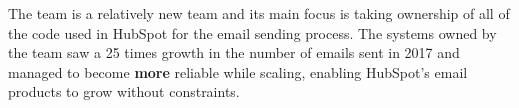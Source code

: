 The \team{} team is a relatively new team and its main focus is taking ownership of all of the code used in HubSpot for the email sending process. The systems owned by the team saw a 25 times growth in the number of emails sent in 2017 and managed to become \textbf{more} reliable while scaling, enabling HubSpot's email products to grow without constraints.  